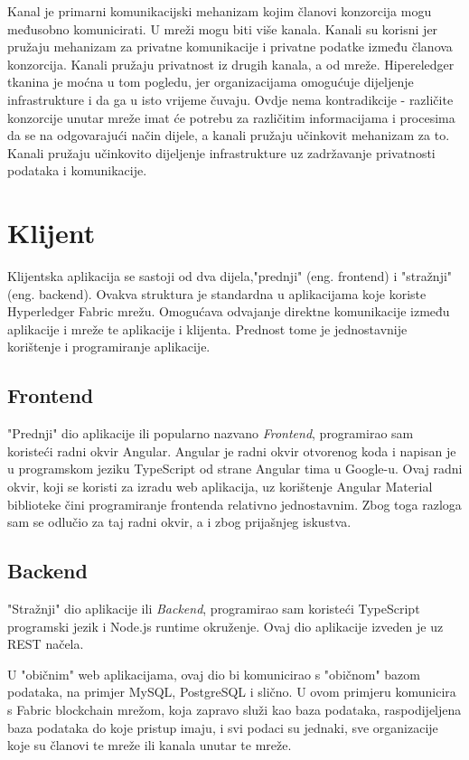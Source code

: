 \documentclass[times, utf8, diplomski]{fer}
\begin{document}
Kanal je primarni komunikacijski mehanizam kojim članovi konzorcija mogu međusobno komunicirati. U mreži mogu biti više kanala. Kanali su korisni jer pružaju mehanizam za privatne komunikacije i privatne podatke između članova konzorcija. Kanali pružaju privatnost iz drugih kanala, a od mreže. Hipereledger tkanina je moćna u tom pogledu, jer organizacijama omogućuje dijeljenje infrastrukture i da ga u isto vrijeme čuvaju. Ovdje nema kontradikcije - različite konzorcije unutar mreže imat će potrebu za različitim informacijama i procesima da se na odgovarajući način dijele, a kanali pružaju učinkovit mehanizam za to. Kanali pružaju učinkovito dijeljenje infrastrukture uz zadržavanje privatnosti podataka i komunikacije.

\section{Klijent}

Klijentska aplikacija se sastoji od dva dijela,"prednji" (eng. frontend) i "stražnji" (eng. backend). Ovakva struktura je standardna u aplikacijama koje koriste Hyperledger Fabric mrežu.  Omogućava odvajanje direktne komunikacije između aplikacije i mreže te aplikacije i klijenta. Prednost tome je jednostavnije korištenje i programiranje aplikacije. 
\subsection{Frontend}

"Prednji" dio aplikacije ili popularno nazvano \textit{Frontend},  programirao sam koristeći radni okvir Angular.  Angular je radni okvir otvorenog koda i napisan je u programskom jeziku TypeScript od strane Angular tima u Google-u. Ovaj radni okvir,  koji se koristi za izradu web aplikacija, uz korištenje Angular Material biblioteke čini programiranje frontenda relativno jednostavnim. Zbog toga razloga sam se odlučio za taj radni okvir, a i zbog prijašnjeg iskustva.  
\subsection{Backend}

"Stražnji" dio aplikacije ili \textit{Backend}, programirao sam koristeći TypeScript programski jezik i Node.js runtime okruženje.  Ovaj dio aplikacije izveden je uz REST načela. %

U "običnim" web aplikacijama, ovaj dio bi komunicirao s "običnom" bazom podataka, na primjer MySQL, PostgreSQL i slično. U ovom primjeru komunicira s Fabric blockchain mrežom, koja zapravo služi kao baza podataka, raspodijeljena baza podataka do koje pristup imaju, i svi podaci su jednaki, sve organizacije koje su članovi te mreže ili kanala unutar te mreže. 
\end{document}
